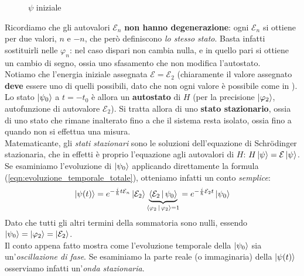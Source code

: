 \documentclass[../../FisicaTeorica.tex]{subfiles}
\begin{document}
\begin{enumerate}
\begin{figure}[H]

\caption{$\psi$ iniziale}
\end{figure}
Ricordiamo che gli autovalori $\mathcal{E}_n$ \textbf{non hanno degenerazione}: ogni $\mathcal{E}_n$ si ottiene per due valori, $n$ e $-n$, che però definiscono \textit{lo stesso stato}. Basta infatti sostituirli nelle $\varphi_n$: nel caso dispari non cambia nulla, e in quello pari si ottiene un cambio di segno, ossia uno sfasamento che non modifica l'autostato.\\ 
Notiamo che l'energia iniziale assegnata $\mathcal{E}=\mathcal{E}_2$ (chiaramente il valore assegnato \textbf{deve} essere uno di quelli possibili, dato che non ogni valore è possibile come in \MC).\\
Lo stato $\Ket{\psi_0}$ a $t=-t_0$ è allora un \textbf{autostato} di $H$ (per la precisione $\Ket{\varphi_2}$, autofunzione di autovalore $\mathcal{E}_2$). Si tratta allora di uno \textbf{stato stazionario}, ossia di uno stato che rimane inalterato fino a che il sistema resta isolato, ossia fino a quando non si effettua una misura.\\
Matematicante, gli \textit{stati stazionari} sono le soluzioni dell'equazione di Schr\"odinger stazionaria, che in effetti è proprio l'equazione agli autovalori di $H$: $H\Ket{\psi}=\mathcal{E}\Ket{\psi}$.\\
Se esaminiamo l'evoluzione di $\Ket{\psi_0}$ applicando direttamente la formula (\ref{eqn:evoluzione_temporale_totale}), otteniamo infatti un conto \textit{semplice}:
\[
\Ket{\psi(t)}=e^{-\frac{i}{\hbar}t\mathcal{E}_n} \Ket{\mathcal{E}_2}\underbrace{\Braket{\mathcal{E}_2|\psi_0}}_{\Braket{\varphi_2|\varphi_2}=1} = e^{-\frac{i}{\hbar}\mathcal{E}_2 t} \Ket{\psi_0}
\]
Dato che tutti gli altri termini della sommatoria sono nulli, essendo $\Ket{\psi_0}=\Ket{\varphi_2}=\Ket{\mathcal{E}_2}$.\\
Il conto appena fatto mostra come l'evoluzione temporale della $\Ket{\psi_0}$ sia un'\textit{oscillazione di fase}. Se esaminiamo la parte reale (o immaginaria) della $\Ket{\psi(t)}$ osserviamo infatti un'\textit{onda stazionaria}.
\\
\begin{figure}[H]
\centering




\end{figure}
\end{enumerate}
\end{document}
